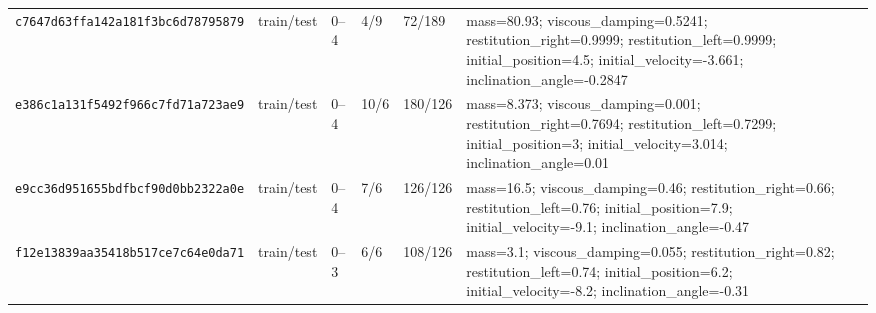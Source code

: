 \begin{tabular*}{\textwidth}{@{\extracolsep{\fill}}llllll@{}}
\texttt{c7647d63ffa142a181f3bc6d78795879} & train/test & 0--4 & 4/9 & 72/189 & mass=80.93; viscous\_damping=0.5241; restitution\_right=0.9999; restitution\_left=0.9999; initial\_position=4.5; initial\_velocity=-3.661; inclination\_angle=-0.2847 \\
\texttt{e386c1a131f5492f966c7fd71a723ae9} & train/test & 0--4 & 10/6 & 180/126 & mass=8.373; viscous\_damping=0.001; restitution\_right=0.7694; restitution\_left=0.7299; initial\_position=3; initial\_velocity=3.014; inclination\_angle=0.01 \\
\texttt{e9cc36d951655bdfbcf90d0bb2322a0e} & train/test & 0--4 & 7/6 & 126/126 & mass=16.5; viscous\_damping=0.46; restitution\_right=0.66; restitution\_left=0.76; initial\_position=7.9; initial\_velocity=-9.1; inclination\_angle=-0.47 \\
\texttt{f12e13839aa35418b517ce7c64e0da71} & train/test & 0--3 & 6/6 & 108/126 & mass=3.1; viscous\_damping=0.055; restitution\_right=0.82; restitution\_left=0.74; initial\_position=6.2; initial\_velocity=-8.2; inclination\_angle=-0.31 \\
\bottomrule
\end{tabular*}
\endgroup
